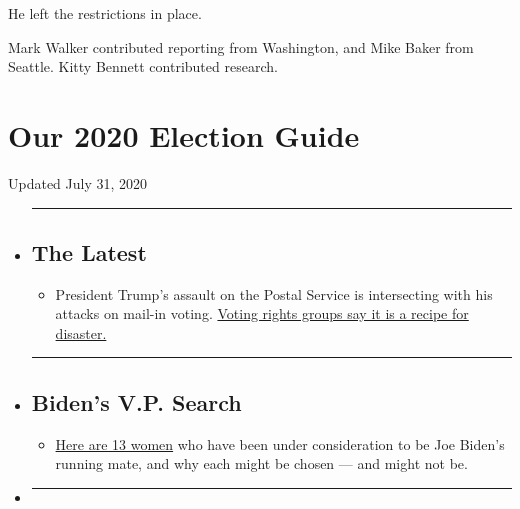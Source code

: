 He left the restrictions in place.

Mark Walker contributed reporting from Washington, and Mike Baker from
Seattle. Kitty Bennett contributed research.

\hypertarget{our-2020-election-guide}{%
\section{Our 2020 Election Guide}\label{our-2020-election-guide}}

Updated July 31, 2020

\begin{itemize}
\item
  \begin{center}\rule{0.5\linewidth}{\linethickness}\end{center}

  \hypertarget{the-latest}{%
  \subsection{The Latest}\label{the-latest}}

  \begin{itemize}
  \tightlist
  \item
    President Trump's assault on the Postal Service is intersecting with
    his attacks on mail-in voting.
    \href{https://www.nytimes.com/2020/07/31/us/politics/trump-usps-mail-delays.html?action=click\&pgtype=Article\&state=default\&region=BELOW_MAIN_CONTENT\&context=storylines_guide}{Voting
    rights groups say it is a recipe for disaster.}
  \end{itemize}
\item
  \begin{center}\rule{0.5\linewidth}{\linethickness}\end{center}

  \hypertarget{bidens-vp-search}{%
  \subsection{Biden's V.P. Search}\label{bidens-vp-search}}

  \begin{itemize}
  \tightlist
  \item
    \href{https://www.nytimes.com/article/biden-vice-president-2020.html?action=click\&pgtype=Article\&state=default\&region=BELOW_MAIN_CONTENT\&context=storylines_guide}{Here
    are 13 women} who have been under consideration to be Joe Biden's
    running mate, and why each might be chosen --- and might not be.
  \end{itemize}
\item
  \begin{center}\rule{0.5\linewidth}{\linethickness}\end{center}


\end{itemize}
